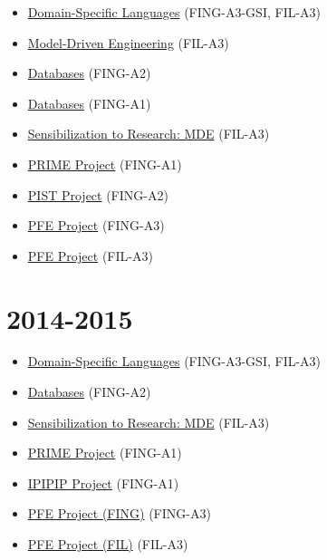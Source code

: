 \begin{itemize}
\tightlist
\item
  \href{https://campusneo.mines-nantes.fr/campus/course/view.php?id=1571}{Domain-Specific
  Languages} (FING-A3-GSI, FIL-A3)
\item
  \href{https://campusneo.mines-nantes.fr/campus/course/view.php?id=1558}{Model-Driven
  Engineering} (FIL-A3)
\item
  \href{https://campusneo.mines-nantes.fr/campus/course/view.php?id=1545}{Databases}
  (FING-A2)
\item
  \href{https://campusneo.mines-nantes.fr/campus/course/view.php?id=1546}{Databases}
  (FING-A1)
\item
  \href{https://campusneo.mines-nantes.fr/campus/course/view.php?id=1532}{Sensibilization
  to Research: MDE} (FIL-A3)
\item
  \href{https://campusneo.mines-nantes.fr/campus/course/view.php?id=621}{PRIME
  Project} (FING-A1)
\item
  \href{https://campusneo.mines-nantes.fr/campus/course/view.php?id=115}{PIST
  Project} (FING-A2)
\item
  \href{https://campusneo.mines-nantes.fr/campus/course/view.php?id=1540}{PFE
  Project} (FING-A3)
\item
  \href{https://campusneo.mines-nantes.fr/campus/course/view.php?id=1344}{PFE
  Project} (FIL-A3)
\end{itemize}

\hypertarget{section-6}{%
\section{2014-2015}\label{section-6}}

\begin{itemize}
\tightlist
\item
  \href{https://campusneo.mines-nantes.fr/campus/course/view.php?id=1472}{Domain-Specific
  Languages} (FING-A3-GSI, FIL-A3)
\item
  \href{https://campusneo.mines-nantes.fr/campus/course/view.php?id=1471}{Databases}
  (FING-A2)
\item
  \href{https://campusneo.mines-nantes.fr/campus/course/view.php?id=1532}{Sensibilization
  to Research: MDE} (FIL-A3)
\item
  \href{https://campusneo.mines-nantes.fr/campus/course/view.php?id=621}{PRIME
  Project} (FING-A1)
\item
  \href{https://campusneo.mines-nantes.fr/campus/course/view.php?id=391}{IPIPIP
  Project} (FING-A1)
\item
  \href{https://campusneo.mines-nantes.fr/campus/course/view.php?id=1486}{PFE
  Project (FING)} (FING-A3)
\item
  \href{https://campusneo.mines-nantes.fr/campus/course/view.php?id=1344}{PFE
  Project (FIL)} (FIL-A3)
\end{itemize}

